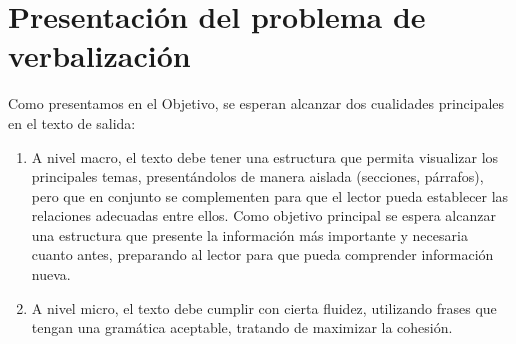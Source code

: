 \section{Presentación del problema de verbalización}
Como presentamos en el Objetivo, se esperan alcanzar dos cualidades principales en el texto de salida:
\begin{enumerate}
    \item A nivel macro, el texto debe tener una estructura que permita visualizar los principales temas, presentándolos de manera aislada (secciones, párrafos), pero que en conjunto se complementen para que el lector pueda establecer las relaciones adecuadas entre ellos. Como objetivo principal se espera alcanzar una estructura que presente la información más importante y necesaria cuanto antes, preparando al lector para que pueda comprender información nueva.
    \item A nivel micro, el texto debe cumplir con cierta fluidez, utilizando frases que tengan una gramática aceptable, tratando de maximizar la cohesión.
\end{enumerate}{}